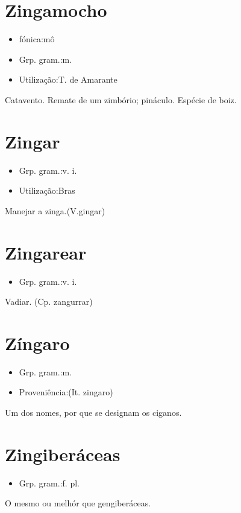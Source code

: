 \section{Zingamocho}
\begin{itemize}
\item {fónica:mô}
\end{itemize}
\begin{itemize}
\item {Grp. gram.:m.}
\end{itemize}
\begin{itemize}
\item {Utilização:T. de Amarante}
\end{itemize}
Catavento.
Remate de um zimbório; pináculo.
Espécie de boiz.
\section{Zingar}
\begin{itemize}
\item {Grp. gram.:v. i.}
\end{itemize}
\begin{itemize}
\item {Utilização:Bras}
\end{itemize}
Manejar a zinga.(V.gingar)
\section{Zingarear}
\begin{itemize}
\item {Grp. gram.:v. i.}
\end{itemize}
Vadiar.
(Cp. \textunderscore zangurrar\textunderscore )
\section{Zíngaro}
\begin{itemize}
\item {Grp. gram.:m.}
\end{itemize}
\begin{itemize}
\item {Proveniência:(It. \textunderscore zingaro\textunderscore )}
\end{itemize}
Um dos nomes, por que se designam os ciganos.
\section{Zingiberáceas}
\begin{itemize}
\item {Grp. gram.:f. pl.}
\end{itemize}
O mesmo ou melhór que \textunderscore gengiberáceas\textunderscore .
